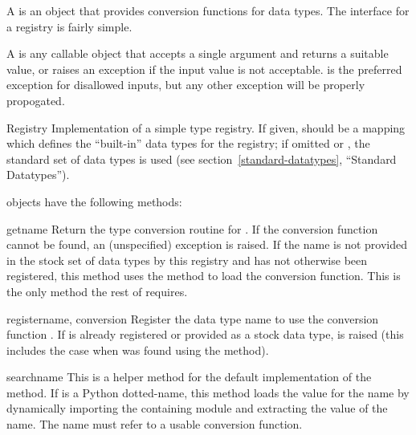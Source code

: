 \documentclass{howto}
\begin{document}
A  is an object that provides conversion
functions for data types.  The interface for a registry is fairly
simple.

A  is any callable object that accepts a
single argument and returns a suitable value, or raises an exception
if the input value is not acceptable.   is the
preferred exception for disallowed inputs, but any other exception
will be properly propogated.

\begin{classdesc}{Registry}{}
  Implementation of a simple type registry.  If given, 
  should be a mapping which defines the ``built-in'' data types for
  the registry; if omitted or , the standard set of data
  types is used (see section~\ref{standard-datatypes}, ``Standard
   Datatypes'').
\end{classdesc}

 objects have the following methods:

\begin{methoddesc}{get}{name}
  Return the type conversion routine for .  If the
  conversion function cannot be found, an (unspecified) exception is
  raised.  If the name is not provided in the stock set of data types
  by this registry and has not otherwise been registered, this method
  uses the  method to load the conversion function.
  This is the only method the rest of  requires.
\end{methoddesc}

\begin{methoddesc}{register}{name, conversion}
  Register the data type name  to use the conversion
  function .  If  is already registered or
  provided as a stock data type,  is raised
  (this includes the case when  was found using the
   method).
\end{methoddesc}

\begin{methoddesc}{search}{name}
  This is a helper method for the default implementation of the
   method.  If  is a Python dotted-name, this
  method loads the value for the name by dynamically importing the
  containing module and extracting the value of the name.  The name
  must refer to a usable conversion function.
\end{methoddesc}
\end{document}
